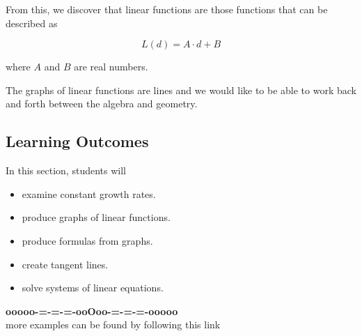 \documentclass{ximera}
\begin{document}
From this, we discover that linear functions are those functions that can be described as

\[  L(d) = A \cdot d + B \]

where $A$ and $B$ are real numbers.


The graphs of linear functions are lines and we would like to be able to work back and forth between the algebra and geometry.
















\subsection*{Learning Outcomes}



\begin{sectionOutcomes}
In this section, students will 

\begin{itemize}
\item examine constant growth rates.
\item produce graphs of linear functions.
\item produce formulas from graphs.
\item create tangent lines.
\item solve systems of linear equations.
\end{itemize}
\end{sectionOutcomes}

















\begin{center}
\textbf{\textcolor{green!50!black}{ooooo-=-=-=-ooOoo-=-=-=-ooooo}} \\

more examples can be found by following this link\\ 

\end{center}
\end{document}
